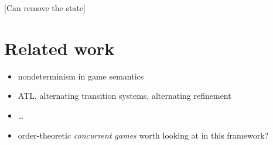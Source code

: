 \documentclass[sigplan,10pt,review,anonymous]{acmart}
\begin{document}
[Can remove the state]



\section{Related work} \label{sec:rw} %

\begin{itemize}
\item nondeterminism in game semantics
\item ATL, alternating transition systems, alternating refinement
\item \ldots
\item order-theoretic \emph{concurrent games} worth looking at
  in this framework?
\end{itemize}




\end{document}
